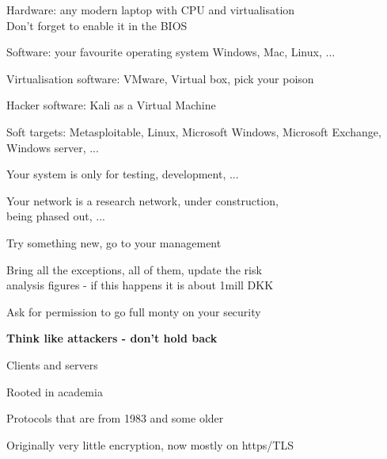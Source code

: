 \documentclass[Screen16to9,17pt]{foils}
\begin{document}


\begin{list2}
\item Hardware: any modern laptop with CPU and virtualisation\\
Don't forget to enable it in the BIOS
\item Software: your favourite operating system Windows, Mac, Linux, ...
\item Virtualisation software: VMware, Virtual box, pick your poison
\item Hacker software: Kali as a Virtual Machine 
\item Soft targets: Metasploitable, Linux, Microsoft Windows, Microsoft Exchange, Windows server, ...
\end{list2}



Your system is only for testing, development, ...

Your network is a research network, under construction, \\
being phased out, ...

Try something new, go to your management

Bring all the exceptions, all of them, update the risk \\
analysis figures - if this happens it is about 1mill DKK

Ask for permission to go full monty on your security

{\bf Think like attackers - don't hold back}







\begin{list1}
\item Clients and servers
\item Rooted in academia
\item Protocols that are from 1983 and some older
\item Originally very little encryption, now mostly on https/TLS
\end{list1}
\end{document}

